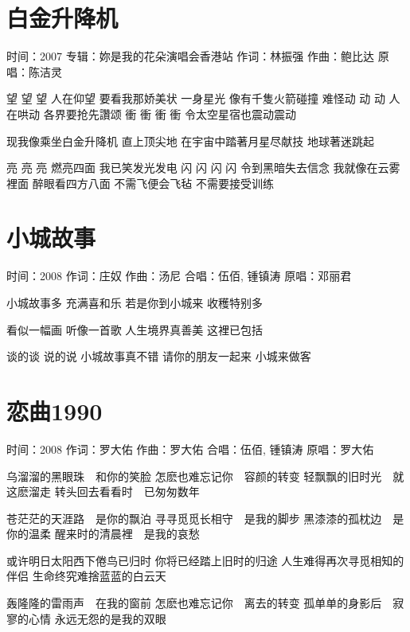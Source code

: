 \documentclass[UTF8,a4paper,oneside,twocolumn,12pt]{ctexbook}
\newcommand{\infopair}[2]{\textbullet #1：#2}
\newcommand{\zc}[1][伍佰]{\infopair{作词}{#1}}
\newcommand{\zq}[1][伍佰]{\infopair{作曲}{#1}}
\newcommand{\zj}[1]{\infopair{专辑}{#1}}
\newcommand{\yc}[1]{\infopair{原唱}{#1}}
\newcommand{\sj}[1]{\infopair{时间}{#1}}
\newenvironment{info}{\begin{flushleft}\kaishu
	}
	{\end{flushleft}\normalsize\yahei\par}
\newenvironment{lyric}{
	}
{}
\begin{document}
\section{白金升降机}%
\begin{info}
	\sj{2007}
	\zj{妳是我的花朵演唱会香港站}
	\zc[林振强]
	\zq[鲍比达]
	\yc{陈洁灵}
\end{info}
\begin{lyric}
	望 望 望 人在仰望 要看我那娇美状
	一身星光 像有千隻火箭碰撞
	难怪动 动 动 人在哄动 各界要抢先讚颂
	衝 衝 衝 衝 令太空星宿也震动震动

	现我像乘坐白金升降机 直上顶尖地
	在宇宙中踏著月星尽献技 地球著迷跳起

	亮 亮 亮 燃亮四面 我已笑发光发电
	闪 闪 闪 闪 令到黑暗失去信念
	我就像在云雾裡面 醉眼看四方八面
	不需飞便会飞毡 不需要接受训练
\end{lyric}

\section{小城故事}
\begin{info}
	\sj{2008}
	\zc[庄奴]
	\zq[汤尼]
	\infopair{合唱}{伍佰, 锺镇涛}
	\yc{邓丽君}
\end{info}
\begin{lyric}
	小城故事多
	充满喜和乐
	若是你到小城来
	收穫特别多

	看似一幅画
	听像一首歌
	人生境界真善美
	这裡已包括

	谈的谈 说的说
	小城故事真不错
	请你的朋友一起来
	小城来做客
\end{lyric}

\section{恋曲1990}
\begin{info}
	\sj{2008}
	\zc[罗大佑]
	\zq[罗大佑]
	\infopair{合唱}{伍佰, 锺镇涛}
	\yc{罗大佑}
\end{info}
\begin{lyric}
	乌溜溜的黑眼珠　和你的笑脸
	怎麽也难忘记你　容颜的转变
	轻飘飘的旧时光　就这麽溜走
	转头回去看看时　已匆匆数年

	苍茫茫的天涯路　是你的飘泊
	寻寻觅觅长相守　是我的脚步
	黑漆漆的孤枕边　是你的温柔
	醒来时的清晨裡　是我的哀愁

	或许明日太阳西下倦鸟已归时
	你将已经踏上旧时的归途
	人生难得再次寻觅相知的伴侣
	生命终究难捨蓝蓝的白云天

	轰隆隆的雷雨声　在我的窗前
	怎麽也难忘记你　离去的转变
	孤单单的身影后　寂寥的心情
	永远无怨的是我的双眼
\end{lyric}
\end{document}
